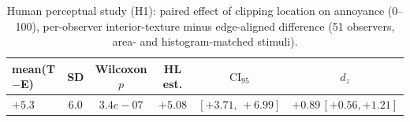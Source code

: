 \begin{table}[t]
\centering
\caption{Human perceptual study (H1): paired effect of clipping location on annoyance (0--100), per-observer interior-texture minus edge-aligned difference (51 observers, area- and histogram-matched stimuli).}
\label{tab:human-h1}
\footnotesize
\begin{tabular}{@{}lccccc@{}}
\toprule
mean(T$-$E) & SD & Wilcoxon $p$ & HL est. & $\mathrm{CI}_{95}$ & $d_z$ \\
\midrule
$+5.3$ & $6.0$ & $3.4e-07$ & $+5.08$ & $[+3.71,\,+6.99]$ & $+0.89\,[+0.56,+1.21]$ \\
\bottomrule
\end{tabular}
\end{table}
